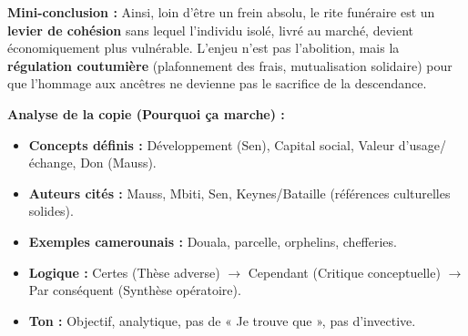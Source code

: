 \documentclass[11pt]{article}
\begin{document}
\begin{exoresolu}
\textbf{Mini-conclusion :} Ainsi, loin d'être un frein absolu, le rite funéraire est un \textbf{levier de cohésion} sans lequel l'individu isolé, livré au marché, devient économiquement plus vulnérable. L'enjeu n'est pas l'abolition, mais la \textbf{régulation coutumière} (plafonnement des frais, mutualisation solidaire) pour que l'hommage aux ancêtres ne devienne pas le sacrifice de la descendance.

\textbf{Analyse de la copie (Pourquoi ça marche) :}
\begin{itemize}
    \item \textbf{Concepts définis :} Développement (Sen), Capital social, Valeur d'usage/échange, Don (Mauss).
    \item \textbf{Auteurs cités :} Mauss, Mbiti, Sen, Keynes/Bataille (références culturelles solides).
    \item \textbf{Exemples camerounais :} Douala, parcelle, orphelins, chefferies.
    \item \textbf{Logique :} Certes (Thèse adverse) $\to$ Cependant (Critique conceptuelle) $\to$ Par conséquent (Synthèse opératoire).
    \item \textbf{Ton :} Objectif, analytique, pas de « Je trouve que », pas d'invective.
\end{itemize}
\end{exoresolu}
\end{document}
